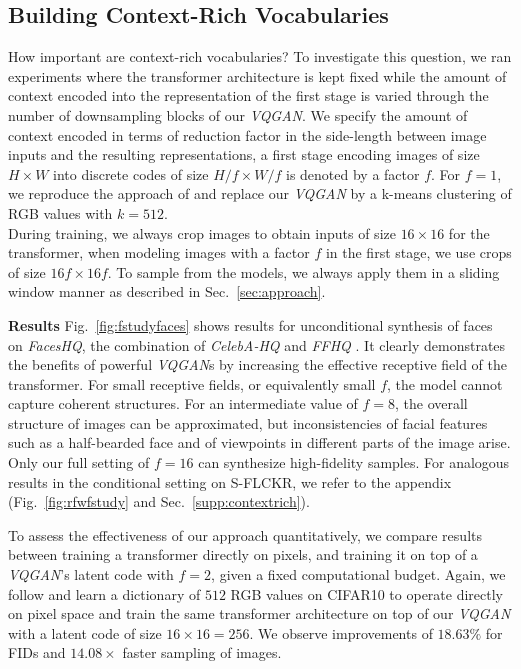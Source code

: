 \documentclass[final]{cvpr}
\begin{document}
\subsection{Building Context-Rich Vocabularies}
\label{sec:wurst}
\fstudyfaces
\noindent
How important are context-rich vocabularies? To investigate this question, we
ran experiments where the transformer architecture is kept fixed while the
amount of context encoded into the representation of the first stage is varied
through the number of downsampling blocks of our \emph{VQGAN}.
We specify the amount of context encoded in terms of reduction factor in the
side-length between image inputs and the resulting representations, \ie a first
stage encoding images of size $H \times W$ into discrete codes of size $H/f \times W/f$ is denoted by a factor $f$. For $f=1$, we reproduce the
approach of \cite{chen2020generative} and replace our \emph{VQGAN} by a k-means clustering of RGB
values with $k=512$. \\
During training, we always crop images to obtain inputs of size $16 \times 16$
for the transformer, \ie when modeling images with a
factor $f$ in the first stage, we use crops of size $16f \times 16f$. 
%
To sample from the models, we
always apply them in a sliding window manner as described in
Sec.~\ref{sec:approach}.

%
%
\noindent \textbf{Results} Fig.~\ref{fig:fstudyfaces} shows results for unconditional
synthesis of faces on \emph{FacesHQ}, the combination of \emph{CelebA-HQ}
\cite{karras2018progressive} and \emph{FFHQ} \cite{karras2019stylebased}. It clearly demonstrates the benefits of
powerful \emph{VQGAN}s by increasing the effective receptive field of the
transformer. For small receptive fields, or equivalently small $f$, the model
cannot capture coherent structures. For an intermediate value of $f=8$, the
overall structure of images can be approximated, but inconsistencies of facial
features such as a half-bearded face and of viewpoints in different parts of
the image arise. Only our full setting of $f=16$ can synthesize high-fidelity
samples. For analogous results in the conditional setting on S-FLCKR, we refer
to the appendix (Fig.~\ref{fig:rfwfstudy} and Sec.~\ref{supp:contextrich}).
%

\noindent
To assess the effectiveness of our approach quantitatively, we compare results between
training a transformer directly on pixels, and training it on top of a
\emph{VQGAN}'s
latent code with $f=2$, given a fixed computational budget. Again, we follow
\cite{chen2020generative} and learn a dictionary of $512$ RGB values on
CIFAR10 to operate directly on pixel space and 
%
train the same transformer architecture on top of our
\emph{VQGAN} with a latent code of size $16\times16=256$. We
observe improvements of $18.63\%$ for FIDs and $14.08\times$ faster
sampling of images.
\end{document}
